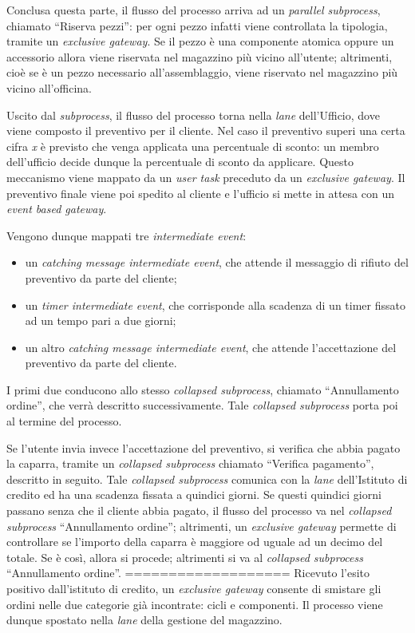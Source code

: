 Conclusa questa parte, il flusso del processo arriva ad un
\textit{parallel subprocess}, chiamato ``Riserva pezzi'': per ogni pezzo
infatti viene controllata la tipologia, tramite un
\textit{exclusive gateway}. Se il pezzo \`e una componente atomica
oppure un accessorio allora viene riservata nel magazzino pi\`u vicino
all'utente; altrimenti, cio\`e se \`e un pezzo necessario
all'assemblaggio, viene riservato nel magazzino pi\`u vicino
all'officina.

Uscito dal \textit{subprocess}, il flusso del processo torna nella
\textit{lane} dell'Ufficio, dove viene composto il preventivo per il
cliente.
Nel caso il preventivo superi una certa cifra \textit{x} \`e previsto
che venga applicata una percentuale di sconto: un membro dell'ufficio
decide dunque la percentuale di sconto da applicare. Questo meccanismo
viene mappato da un \textit{user task} preceduto da un
\textit{exclusive gateway}. Il preventivo finale viene poi spedito al
cliente e l'ufficio si mette in attesa con un
\textit{event based gateway}.

Vengono dunque mappati tre \textit{intermediate event}:
\begin{itemize}
  \item un \textit{catching message intermediate event}, che attende il
  messaggio di rifiuto del preventivo da parte del cliente;
  \item un \textit{timer intermediate event}, che corrisponde alla
  scadenza di un timer fissato ad un tempo pari a due giorni;
  \item un altro \textit{catching message intermediate event}, che
  attende l'accettazione del preventivo da parte del cliente.
\end{itemize}
I primi due conducono allo stesso \textit{collapsed subprocess},
chiamato ``Annullamento ordine'', che verr\`a descritto successivamente.
Tale \textit{collapsed subprocess} porta poi al termine del processo.

Se l'utente invia invece l'accettazione del preventivo, si verifica che
abbia pagato la caparra, tramite un \textit{collapsed subprocess}
chiamato ``Verifica pagamento'', descritto in seguito. Tale
\textit{collapsed subprocess} comunica con la \textit{lane}
dell'Istituto di credito ed ha una scadenza fissata a quindici giorni.
Se questi quindici giorni passano senza che il cliente abbia pagato, il
flusso del processo va nel \textit{collapsed subprocess} ``Annullamento
ordine''; altrimenti, un \textit{exclusive gateway} permette di
controllare se l'importo della caparra \`e maggiore od uguale ad un
decimo del totale. Se \`e cos\`i, allora si procede; altrimenti si va
al \textit{collapsed subprocess} ``Annullamento ordine''.
===================
Ricevuto l'esito positivo dall'istituto di credito, un
\textit{exclusive gateway} consente di smistare gli ordini nelle due
categorie gi\`a incontrate: cicli e componenti. Il processo viene dunque
spostato nella \textit{lane} della gestione del magazzino.

